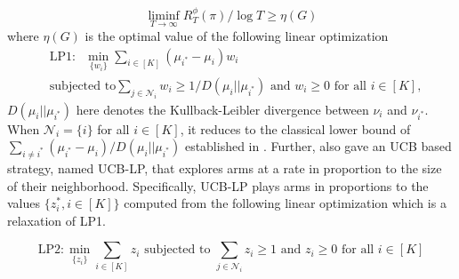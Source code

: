 \begin{equation}
   \label{eqn:MABLowerBound}
	\liminf_{T \rightarrow \infty} R^{\phi}_T(\pi)/\log T \geq \eta(G)
	\end{equation}
		where $\eta(G)$ is the optimal value of the following linear optimization
	\begin{align}
	& \mbox{LP1}:\; \;\displaystyle\min_{\{w_i\}}\sum_{i \in [K]}(\mu_{i^*}- \mu_i) w_i \nonumber\\
	\label{eqn:LowerBoundLP}
	& \mbox{subjected to} \sum_{j \in \mathcal{N}_i}w_i\geq 1/D(\mu_i || \mu_{i^*}) \mbox{ and } w_i \geq 0 \mbox{  for all } i\in [K],
	\end{align}
$D(\mu_i || \mu_{i^*})$ here denotes the Kullback-Leibler divergence between $\nu_i$ and $\nu_{i^*}$. 
When $\mathcal{N}_i=\{i\}$ for all $i\in [K]$, it reduces to the classical lower bound of $\sum_{i\neq i^*}(\mu_{i^*}- \mu_i)/D(\mu_i || \mu_{i^*})$ established in \cite{AAM85_Asymptotically_LaiRobbins}. Further, \cite{Sigmetrics15_StochasticBanditsWithSideObservations_BuccapatnamEriyilmazShroff} also gave an UCB based strategy, named UCB-LP, that explores arms at a rate in proportion to the size of their neighborhood. Specifically, UCB-LP plays arms in proportions to the values $\{z_i^*, i\in [K]\}$ computed from the following linear optimization which is a relaxation of LP1. 

	\begin{equation}
	\label{eqn:LowerRelaxedBoundLP}
	\mbox{LP2}: \displaystyle\min_{\{z_i\}}\sum_{i \in [K]} z_i 
	 \mbox{ subjected to } \sum_{j \in \mathcal{N}_i}z_i\geq 1 \mbox{ and } z_i \geq 0 \mbox{  for all } i\in [K]
	\end{equation}

